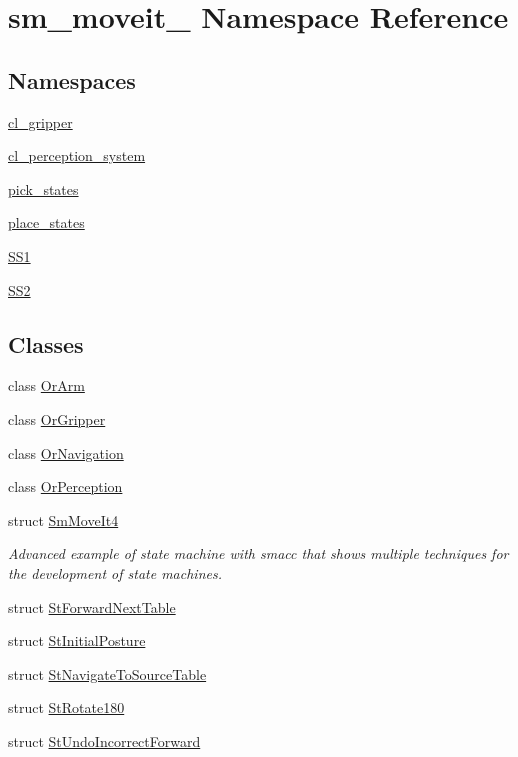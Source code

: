 \hypertarget{namespacesm__moveit__4}{}\section{sm\+\_\+moveit\+\_ Namespace Reference}
\label{namespacesm__moveit__4}
\subsection*{Namespaces}
\begin{DoxyCompactItemize}
\item 
 \hyperlink{namespacesm__moveit__4_1_1cl__gripper}{cl\+\_\+gripper}
\item 
 \hyperlink{namespacesm__moveit__4_1_1cl__perception__system}{cl\+\_\+perception\+\_\+system}
\item 
 \hyperlink{namespacesm__moveit__4_1_1pick__states}{pick\+\_\+states}
\item 
 \hyperlink{namespacesm__moveit__4_1_1place__states}{place\+\_\+states}
\item 
 \hyperlink{namespacesm__moveit__4_1_1SS1}{S\+S1}
\item 
 \hyperlink{namespacesm__moveit__4_1_1SS2}{S\+S2}
\end{DoxyCompactItemize}
\subsection*{Classes}
\begin{DoxyCompactItemize}
\item 
class \hyperlink{classsm__moveit__4_1_1OrArm}{Or\+Arm}
\item 
class \hyperlink{classsm__moveit__4_1_1OrGripper}{Or\+Gripper}
\item 
class \hyperlink{classsm__moveit__4_1_1OrNavigation}{Or\+Navigation}
\item 
class \hyperlink{classsm__moveit__4_1_1OrPerception}{Or\+Perception}
\item 
struct \hyperlink{structsm__moveit__4_1_1SmMoveIt4}{Sm\+Move\+It4}
\begin{DoxyCompactList}\small\item\em Advanced example of state machine with smacc that shows multiple techniques for the development of state machines. \end{DoxyCompactList}\item 
struct \hyperlink{structsm__moveit__4_1_1StForwardNextTable}{St\+Forward\+Next\+Table}
\item 
struct \hyperlink{structsm__moveit__4_1_1StInitialPosture}{St\+Initial\+Posture}
\item 
struct \hyperlink{structsm__moveit__4_1_1StNavigateToSourceTable}{St\+Navigate\+To\+Source\+Table}
\item 
struct \hyperlink{structsm__moveit__4_1_1StRotate180}{St\+Rotate180}
\item 
struct \hyperlink{structsm__moveit__4_1_1StUndoIncorrectForward}{St\+Undo\+Incorrect\+Forward}
\end{DoxyCompactItemize}
